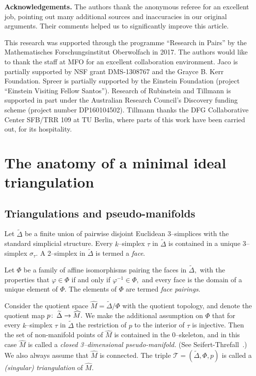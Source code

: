 \documentclass[a4paper]{gtart}
\def\tri{\mathcal{T}}
\def\manifold{M}
\theoremstyle{plain}
\theoremstyle{definition}
\theoremstyle{remark}
\numberwithin{equation}{section}
\begin{document}

\textbf{Acknowledgements.}
The authors thank the anonymous referee for an excellent job, pointing out many additional sources and inaccuracies in our original arguments. Their comments helped us to significantly improve this article.

This research was supported through the programme ``Research in Pairs'' by the Mathematisches Forschungsinstitut Oberwolfach in 2017. The authors would like to thank the staff at MFO for an excellent collaboration environment.
Jaco is partially supported by NSF grant DMS-1308767 and the Grayce B. Kerr Foundation.
Spreer is partially supported by the Einstein Foundation (project ``Einstein Visiting Fellow Santos''). 
Research of Rubinstein and Tillmann is supported in part under the Australian Research Council's Discovery funding scheme (project number DP160104502). Tillmann thanks the DFG Collaborative Center SFB/TRR 109 at TU Berlin, where parts of this work have been carried out, for its hospitality.


\section{The anatomy of a minimal ideal triangulation}
\label{sec:anatomy}


\subsection{Triangulations and pseudo-manifolds}
\label{sec:Triangulations}

Let $\widetilde{\Delta}$ be a finite union of pairwise disjoint Euclidean 3--simplices with the standard simplicial structure. Every $k$--simplex $\tau$ in $\widetilde{\Delta}$ is contained in a unique 3--simplex $\sigma_\tau.$ A 2--simplex in $\widetilde{\Delta}$ is termed a \emph{face}.

Let $\Phi$ be a family of affine isomorphisms pairing the faces in $\widetilde{\Delta},$ with the properties that $\varphi \in \Phi$ if and only if $\varphi^{-1}\in \Phi,$ and every face is the domain of a unique element of $\Phi.$ The elements of $\Phi$ are termed \emph{face pairings}.

Consider the quotient space $\widehat{\manifold} = \widetilde{\Delta}/\Phi$ with the quotient topology, and denote the quotient map $p\co \widetilde{\Delta} \to \widehat{\manifold}.$ We make the additional assumption on $\Phi$ that for every $k$--simplex $\tau$ in $\widetilde{\Delta}$ the restriction of $p$ to the interior of $\tau$ is injective. Then
the set of non-manifold points of $\widehat{\manifold}$ is contained in the 0--skeleton, and in this case $\widehat{\manifold}$ is called a \emph{closed 3--dimensional pseudo-manifold.} (See Seifert-Threfall~\cite{Seifert-textbook-1980}.) We also always assume that $\widehat{\manifold}$ is connected.
The triple $\tri = ( \widetilde{\Delta}, \Phi, p)$ is called a \emph{(singular) triangulation} of $\widehat{\manifold}.$
\end{document}

